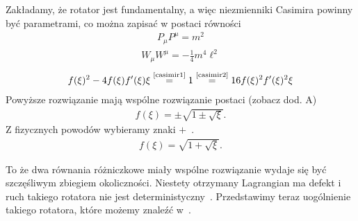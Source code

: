 Zakładamy, że rotator jest fundamentalny, a więc niezmienniki
Casimira powinny być parametrami, co można zapisać w postaci
równości
\begin{align} \label{casimir1}
P_\mu P^\mu = m^2 \tag{C1}
\end{align}
\begin{align} \label{casimir2}
W_\mu W^\mu = - \frac{1}{4} m^4 \ell^2\tag{C2}
\end{align}
\begin{align*} 
 f(\xi)^2- 4 f(\xi) f'(\xi) \xi
\stackrel{\text{\ref{casimir1}}}{=} 
1 \stackrel{\text{\ref{casimir2}}}{=}
  16   f(\xi)^2 f'(\xi)^2 \xi
\end{align*}
Powyższe rozwiązanie mają wspólne rozwiązanie 
postaci (zobacz dod. A)
\begin{align*}
f(\xi ) = \pm \sqrt{ 1 \pm \sqrt{\xi} }.
\end{align*}
Z fizycznych powodów wybieramy znaki $+$~\cite{Bratek2009nonuniq}.
\begin{align*}
f(\xi ) =  \sqrt{ 1 + \sqrt{\xi} }.
\end{align*}

To że dwa równania różniczkowe miały wspólne rozwiązanie 
wydaje się być szczęśliwym zbiegiem okoliczności. 
Niestety otrzymany Lagrangian ma defekt i ruch takiego 
rotatora nie jest deterministyczny~\cite{Bratek2012Spinorindeterm}.
Przedstawimy teraz uogólnienie takiego rotatora,
które możemy znaleźć w~\cite{Bratek2015wiele}.


